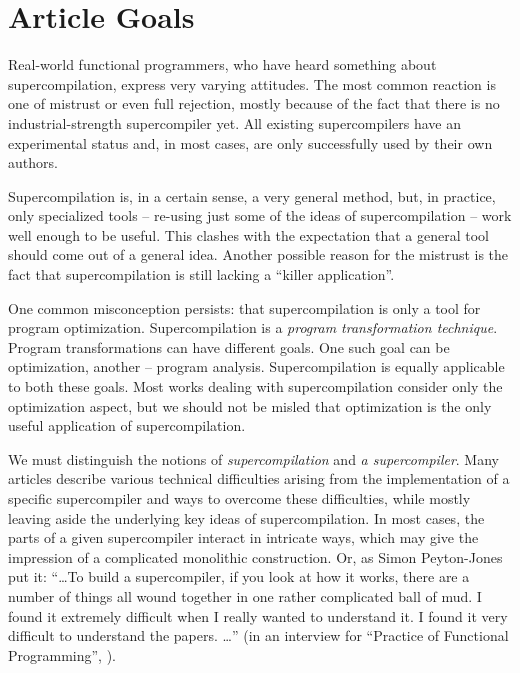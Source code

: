 \section{Article Goals}

%

Real-world functional programmers, who have heard something about supercompilation,
express very varying attitudes.
The most common reaction is one of mistrust or even full rejection, 
mostly because of the fact that there is no industrial-strength supercompiler yet. 
All existing supercompilers have an experimental status
and, in most cases, are only successfully used by their own authors.

Supercompilation is, in a certain sense, a very general method, but, in practice, only
specialized tools -- re-using just some of the ideas of supercompilation -- work well
enough to be useful. 
This clashes with the expectation that a general tool should come out of a general idea.
Another possible reason for the mistrust is the fact that supercompilation is still lacking a ``killer application''.

One common misconception persists: that supercompilation is only a tool for program optimization.
Supercompilation is a \emph{program transformation technique}.
Program transformations can have different goals.
One such goal can be optimization, another -- program analysis.
Supercompilation is equally applicable to both these goals.
Most works dealing with supercompilation consider only the optimization aspect,
but we should not be misled that optimization is the only useful application of supercompilation.

We must distinguish the notions of \emph{supercompilation} and \emph{a supercompiler}.
Many articles describe various technical difficulties arising from the implementation
of a specific supercompiler and ways to overcome these difficulties, while mostly
leaving aside the underlying key ideas of supercompilation.
In most cases, the parts of a given supercompiler interact in intricate ways, which
may give the impression of a complicated monolithic 
construction.
Or, as Simon Peyton-Jones put it: 
``\ldots To build a supercompiler, if you look at how it works, there are a number of things all wound together in one rather complicated ball of mud. 
I found it extremely difficult when I really wanted to understand it. 
I found it very difficult to understand the papers. \ldots''
(in an interview for ``Practice of Functional Programming'', \cite{Jones2010Interview}).

